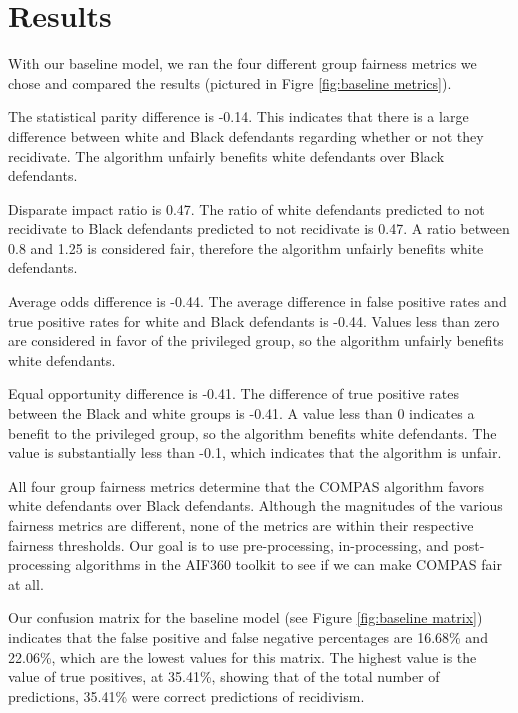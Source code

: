 \documentclass[water,article,submit,moreauthors,pdftex]{mdpi}
\begin{document}
\hypertarget{results}{%
\section{Results}\label{results}}

With our baseline model, we ran the four different group fairness
metrics we chose and compared the results (pictured in Figre
\ref{fig:baseline metrics}).

The statistical parity difference is -0.14. This indicates that there is
a large difference between white and Black defendants regarding whether
or not they recidivate. The algorithm unfairly benefits white defendants
over Black defendants.

Disparate impact ratio is 0.47. The ratio of white defendants predicted
to not recidivate to Black defendants predicted to not recidivate is
0.47. A ratio between 0.8 and 1.25 is considered fair, therefore the
algorithm unfairly benefits white defendants.

Average odds difference is -0.44. The average difference in false
positive rates and true positive rates for white and Black defendants is
-0.44. Values less than zero are considered in favor of the privileged
group, so the algorithm unfairly benefits white defendants.

Equal opportunity difference is -0.41. The difference of true positive
rates between the Black and white groups is -0.41. A value less than 0
indicates a benefit to the privileged group, so the algorithm benefits
white defendants. The value is substantially less than -0.1, which
indicates that the algorithm is unfair.

All four group fairness metrics determine that the COMPAS algorithm
favors white defendants over Black defendants. Although the magnitudes
of the various fairness metrics are different, none of the metrics are
within their respective fairness thresholds. Our goal is to use
pre-processing, in-processing, and post-processing algorithms in the
AIF360 toolkit to see if we can make COMPAS fair at all.

Our confusion matrix for the baseline model (see Figure
\ref{fig:baseline matrix}) indicates that the false positive and false
negative percentages are 16.68\% and 22.06\%, which are the lowest
values for this matrix. The highest value is the value of true
positives, at 35.41\%, showing that of the total number of predictions,
35.41\% were correct predictions of recidivism.
\end{document}
